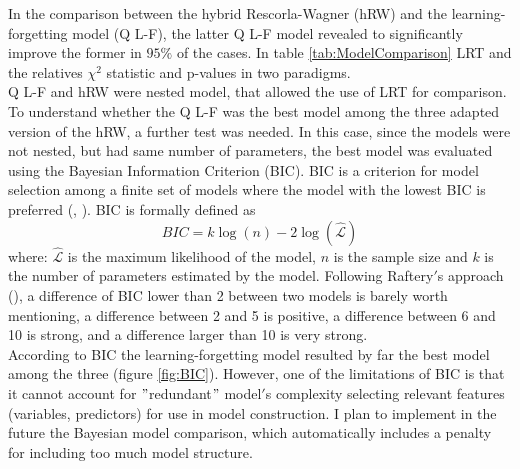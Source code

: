 In the comparison between the hybrid Rescorla-Wagner (hRW) and the learning-forgetting model (Q L-F), the latter Q L-F model revealed to significantly improve the former in $95\%$ of the cases. In table \ref{tab:ModelComparison} LRT and the relatives $\chi^2$ statistic and p-values in two paradigms.\\Q L-F and hRW were nested model, that allowed the use of LRT for comparison. To understand whether the Q L-F was the best model among the three adapted version of the hRW, a further test was needed. In this case, since the models were not nested, but had same number of parameters, the best model was evaluated using the Bayesian Information Criterion (BIC). BIC is a criterion for model selection among a finite set of models where the model with the lowest BIC is preferred (\cite{Schwarz}, \cite{NeathCavanaugh}). BIC is formally defined as 
\begin{equation*}
    BIC=k\log(n)-2\log(\hat{\mathcal{L}})
\end{equation*}
where: ${\hat{\mathcal{L}}}$ is the maximum likelihood of the model, $n$ is the sample size and $k$ is the number of parameters estimated by the model. Following Raftery$'$s approach (\cite{Raftery}), a difference of BIC lower than 2 between two models is barely worth mentioning, a difference between 2 and 5 is positive, a difference between 6 and 10 is strong, and a difference larger than 10 is very strong.\\According to BIC the learning-forgetting model resulted by far the best model among the three (figure \ref{fig:BIC}). However, one of the limitations of BIC is that it cannot account for $"$redundant$"$ model$'$s complexity selecting relevant features (variables, predictors) for use in model construction. I plan to implement in the future the Bayesian model comparison, which automatically includes a penalty for including too much model structure.
